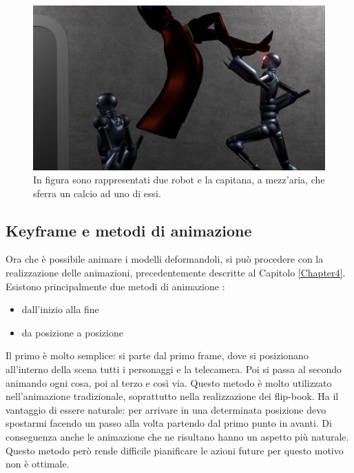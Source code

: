 \begin{figure}
\centering
\includegraphics[width=\textwidth]{Figures/screen2}
\decoRule
\caption[Scena esempio 3]{In figura sono rappresentati due robot e la capitana, a mezz'aria, che sferra un calcio ad uno di essi.}
\label{fig:eg3}
\end{figure}

\subsection{Keyframe e metodi di animazione}
Ora che è possibile animare i modelli deformandoli, si può procedere con la realizzazione delle animazioni, precedentemente descritte al Capitolo \ref{Chapter4}.
Esistono principalmente due metodi di animazione \cite{Williams:2009:ASK:1823185}:
\begin{itemize}
    \item dall'inizio alla fine
    \item da posizione a posizione
\end{itemize}
Il primo è molto semplice: si parte dal primo frame, dove si posizionano all'interno della scena tutti i personaggi e la telecamera. Poi si passa al secondo animando ogni cosa, poi al terzo e così via. 
Questo metodo è molto utilizzato nell'animazione tradizionale, soprattutto nella realizzazione dei flip-book.
Ha il vantaggio di essere naturale: per arrivare in una determinata posizione devo spostarmi facendo un passo alla volta partendo dal primo punto in avanti.
Di conseguenza anche le animazione che ne risultano hanno un aspetto più naturale.
Questo metodo però rende difficile pianificare le azioni future per questo motivo non è ottimale.


